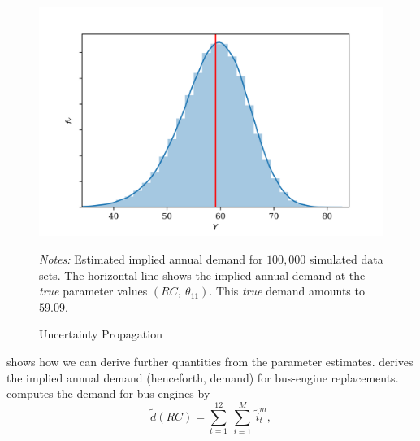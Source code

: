\begin{figure}[t]
	\caption{Uncertainty Propagation}
    \label{uncertainty}
	\begin{centering}
	\vspace*{-4mm}
	\begin{centering}
		\includegraphics[scale=0.9]{../figures/uncertainty_propagation_100000.png}
	\end{centering}
	\end{centering}

	\small
	\textit{Notes:} Estimated implied annual demand for $100,000$ simulated data sets. The horizontal line shows the implied annual demand at the \textit{true} parameter values $(RC,\ \theta_{11})$. This \textit{true} demand amounts to $59.09$.
\end{figure}

\citet{R87} shows how we can derive further quantities from the parameter estimates. \citet{R87} derives the implied annual demand (henceforth, demand) for bus-engine replacements. \citet{R87} computes the demand for bus engines by
\begin{equation}
\tilde{d}(RC)=\sum_{t=1}^{12}\ \sum_{i=1}^{M}\ {\tilde{i}}_t^m,
\end{equation}

